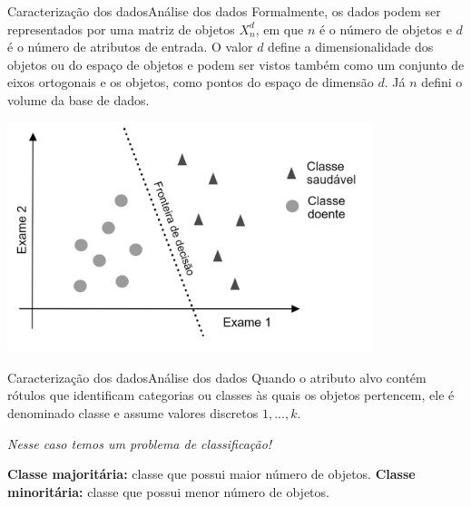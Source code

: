 \documentclass[t]{beamer}
\begin{document}

\begin{ftst}{Caracterização dos dados}{Análise dos dados}
\small
Formalmente, os dados podem ser representados por uma matriz de objetos $X_n^d$, em que $n$ é o número de objetos e $d$ é o número de atributos de entrada.
\vone
O valor $d$ define a dimensionalidade dos objetos ou do espaço de objetos e podem ser vistos também como um conjunto de eixos ortogonais e os objetos, como pontos do espaço de dimensão $d$.
\vone
Já $n$ defini o volume da base de dados.

\begin{table}
	\begin{minipage}{0.4\linewidth}
		\centering
	\end{minipage}\hfill
	\begin{minipage}{0.6\linewidth}
		\centering
		\label{figu:re}
		\includegraphics[width=0.8\textwidth]{Figuras/slide01_01.png}
	\end{minipage}
\end{table}


\end{ftst}



\begin{ftst}{Caracterização dos dados}{Análise dos dados}
Quando o atributo alvo contém rótulos que identificam categorias ou classes às quais os objetos pertencem, ele é denominado classe e assume valores discretos $1,...,k$.
\vone
\begin{center}
    \textit{Nesse caso temos um problema de classificação!}
\end{center}

\vone

\textbf{Classe majoritária:} classe que possui maior número de objetos.
\vone
\textbf{Classe minoritária: }classe que possui menor número de objetos.
\end{ftst}
\end{document}
